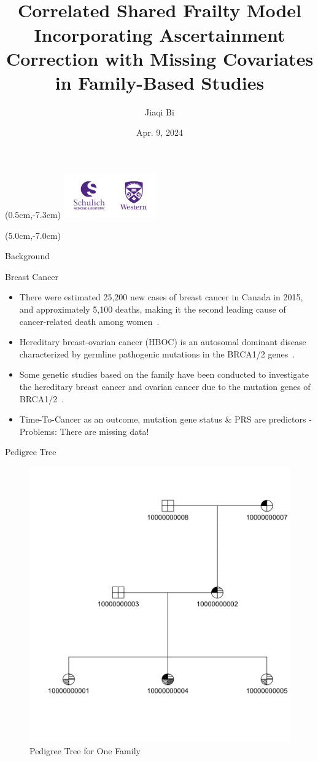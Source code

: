 \documentclass [aspectratio=169]{beamer}
\title[]{\vspace{40pt} \\
Correlated Shared Frailty Model
Incorporating Ascertainment Correction with Missing Covariates
in Family-Based Studies}
\author[]{Jiaqi Bi}
\date{Apr. 9, 2024}
\begin{document}
{
\begin{frame}
    \titlepage
    \begin{textblock*}{4cm}(0.5cm,-7.3cm)
        \includegraphics[width=4cm]{schulich uwo.png}
    \end{textblock*}
    \begin{textblock*}{8cm}(5.0cm,-7.0cm)
        \huge {}
    \end{textblock*}
\end{frame}
}

\begin{frame}{Background}
    \begin{block}{Breast Cancer}
        \begin{itemize}
            \item There were estimated 25,200 new cases of breast cancer in Canada in 2015, and approximately 5,100 deaths, making it the second leading cause of cancer-related death among women~\cite{BCCanadaStatistics2023}.
            \item Hereditary breast-ovarian cancer (HBOC) is an autosomal dominant disease characterized by germline pathogenic mutations in the BRCA1/2 genes~\cite{pritchard2019new}.
            \item Some genetic studies based on the family have been conducted to investigate the hereditary breast cancer and ovarian cancer due to the mutation genes of BRCA1/2~\cite{choi2021association}.
            \item Time-To-Cancer as an outcome, mutation gene status \& PRS are predictors - Problems: There are missing data!
        \end{itemize}
    \end{block}
\end{frame}

\begin{frame}{Pedigree Tree}
    \begin{figure}[!htb]
        \centering
        \includegraphics[width=0.5\linewidth]{figures/pedigreetree.png}
        \caption{Pedigree Tree for One Family}
    \end{figure}
\end{frame}
\end{document}
